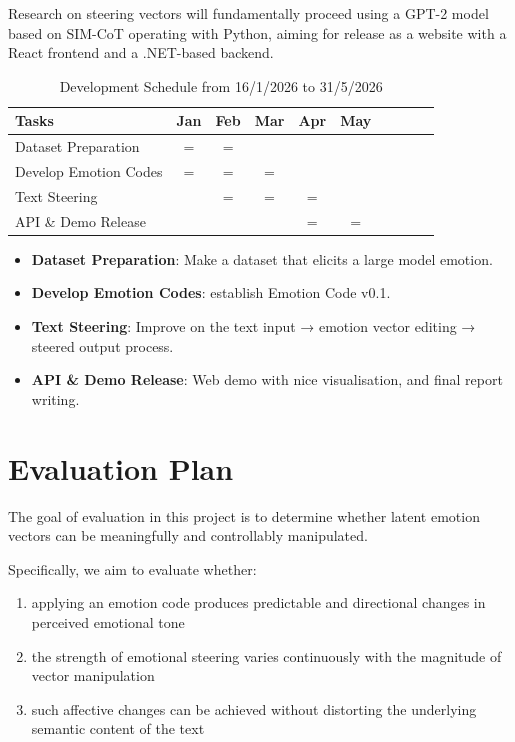 \documentclass[12pt,twoside]{report}
\begin{document}
Research on steering vectors will fundamentally proceed using a GPT-2 model based on SIM-CoT operating with Python, aiming for release as a website with a React frontend and a .NET-based backend.

\begin{table}[H]
\centering
\small
\begin{tabular}{l|c c c c c c c c c}
\toprule
\textbf{Tasks} & Jan & Feb & Mar & Apr & May \\
\midrule
Dataset Preparation     & = & = &   &   &   \\
Develop Emotion Codes   & = & = & = &   &   \\
Text Steering           &   & = & = & = &   \\
API \& Demo Release     &   &   &   & = & = \\
\bottomrule
\end{tabular}
\caption{Development Schedule from 16/1/2026 to 31/5/2026}
\end{table}

\begin{itemize}
  \item \textbf{Dataset Preparation}: Make a dataset that elicits a large model emotion.
  \item \textbf{Develop Emotion Codes}: establish Emotion Code v0.1.
  \item \textbf{Text Steering}: Improve on the text input → emotion vector editing → steered output process.
  \item \textbf{API \& Demo Release}: Web demo with nice visualisation, and final report writing.
\end{itemize}

\chapter{Evaluation Plan}

The goal of evaluation in this project is to determine whether latent emotion vectors can be meaningfully and controllably manipulated.

Specifically, we aim to evaluate whether:

\begin{enumerate}
    \item applying an emotion code produces predictable and directional changes in perceived emotional tone
    \item the strength of emotional steering varies continuously with the magnitude of vector manipulation
    \item such affective changes can be achieved without distorting the underlying semantic content of the text
\end{enumerate}
\end{document}
